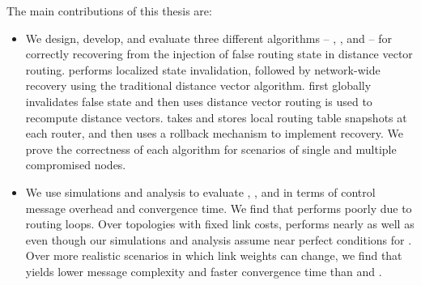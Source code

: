 The main contributions of this thesis are:
\begin{itemize}

	\item  We design, develop, and evaluate three different algorithms -- \seconds, \purges, and \cpr -- for correctly recovering from the injection of false routing state in distance vector routing.
		\second performs localized state invalidation, followed by network-wide recovery using the traditional distance vector algorithm. 
		\purge first globally invalidates false state and then uses distance vector routing is used to recompute distance vectors.  \cpr takes and stores local routing table snapshots at each router, and then uses 
		a rollback mechanism to implement recovery. We prove the correctness of each algorithm for scenarios of single and multiple compromised nodes.

	



	\item We use simulations and analysis to evaluate \seconds, \purges, and \cpr in terms of control message overhead and convergence time. We find that \second performs poorly due to routing loops.  
	Over topologies with fixed link costs, \purge performs nearly as well as \cpr even though our simulations and analysis assume near perfect conditions for \cprs.
	Over more realistic scenarios in which link weights can change, we find that \purge yields lower message complexity and faster convergence time than \cpr and \seconds. 

	

\end{itemize}
